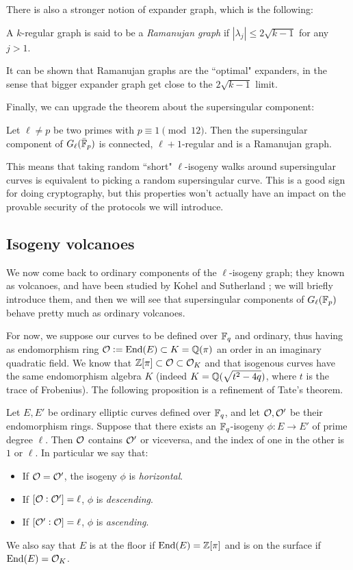 There is also a stronger notion of expander graph, which is the following:
\begin{definition}
    A $k$-regular graph is said to be a \emph{Ramanujan graph} if $|\lambda_j|\le2\sqrt{k-1}$ for any $j>1$.
\end{definition}
It can be shown that Ramanujan graphs are the ``optimal" expanders, in the sense that bigger expander graph get close to the $2\sqrt{k-1}$ limit.

Finally, we can upgrade the theorem about the supersingular component:
\begin{theorem}
    Let $\ell\neq p$ be two primes with $p\equiv1\pmod{12}$. Then the supersingular component of $G_\ell(\bar{\mathbb{F}}_p)$ is connected, $\ell+1$-regular and is a Ramanujan graph.
\end{theorem}
This means that taking random ``short" $\ell$-isogeny walks around supersingular curves is equivalent to picking a random supersingular curve. This is a good sign for doing cryptography, but this properties won't actually have an impact on the provable security of the protocols we will introduce.

\subsection{Isogeny volcanoes}
We now come back to ordinary components of the $\ell$-isogeny graph; they known as volcanoes, and have been studied by Kohel \cite{Kohel_thesis} and Sutherland \cite{Sutherland_volcanoes}; we will briefly introduce them, and then we will see that supersingular components of $G_\ell(\mathbb{F}_p)$ behave pretty much as ordinary volcanoes.

For now, we suppose our curves to be defined over $\mathbb{F}_q$ and ordinary, thus having as endomorphism ring $\mathcal{O}:=\operatorname{End}(E)\subset K=\mathbb{Q}(\pi)$ an order in an imaginary quadratic field. We know that $\mathbb{Z}[\pi]\subset \mathcal{O}\subset\mathcal{O}_K$ and that isogenous curves have the same endomorphism algebra $K$ (indeed $K=\mathbb{Q}(\sqrt{t^2-4q})$, where $t$ is the trace of Frobenius). The following proposition is a refinement of Tate's theorem.
\begin{proposition}
    Let $E,E'$ be ordinary elliptic curves defined over $\mathbb{F}_q$, and let $\mathcal{O},\mathcal{O}'$ be their endomorphism rings. Suppose that there exists an $\mathbb{F}_q$-isogeny $\phi:E\to E'$ of prime degree $\ell$. Then $\mathcal{O}$ contains $\mathcal{O}'$ or viceversa, and the index of one in the other is $1$ or $\ell$. In particular we say that:
    \begin{itemize}
        \item If $\mathcal{O}=\mathcal{O}'$, the isogeny $\phi$ is \emph{horizontal}.
        \item If $[\mathcal{O}:\mathcal{O}']=\ell$, $\phi$ is \emph{descending}.
        \item If $[\mathcal{O}':\mathcal{O}]=\ell$, $\phi$ is \emph{ascending}.
    \end{itemize}
\end{proposition}
We also say that $E$ is at the floor if $\operatorname{End}(E)=\mathbb{Z}[\pi]$ and is on the surface if $\operatorname{End}(E)=\mathcal{O}_K$.

